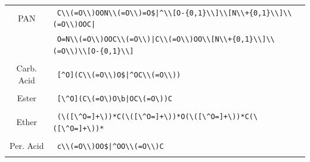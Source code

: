 \begin{table}[H]
    \centering
    \begin{tabular}{c|p{5in}}


PAN & \verb! C\\(=O\\)OON\\(=O\\)=O$|^\\[O-{0,1}\\]\\[N\\+{0,1}\\]\\(=O\\)OOC|!\\&\verb! O=N\\(=O\\)OOC\\(=O\\)|C\\(=O\\)OO\\[N\\+{0,1}\\]\\(=O\\)\\[O-{0,1}\\]!\\&\\

Carb. Acid & \verb! [^O](C\\(=O\\)O$|^OC\\(=O\\))!\\&\\

Ester & \verb! [\^O](C\(=O\)O\b|OC\(=O\))C!\\&\\

Ether & \verb! (\([\^O=]+\))*C(\([\^O=]+\))*O(\([\^O=]+\))*C(\([\^O=]+\))*!\\&\\

Per. Acid & \verb! c\\(=O\\)OO$|^OO\\(=O\\)C!\\&\\



\end{tabular}
\end{table}
